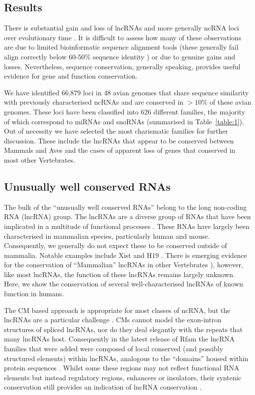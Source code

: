 \documentclass[10pt]{bmc_article}
\newenvironment{bmcformat}{\begin{raggedright}\baselineskip20pt\sloppy\setboolean{publ}{false}}{\end{raggedright}\baselineskip20pt\sloppy}
\begin{document}
\begin{bmcformat}
\section*{Results}

There is substantial gain and loss of lncRNAs
\cite{Cabili:2011,Kutter:2012} and more generally ncRNA loci over
evolutionary time \cite{Hoeppner:2012}. It is difficult to assess how
many of these observations are due to limited bioinformatic sequence
alignment tools (these generally fail align correctly below 60-50\%
sequence identity \cite{Gardner:2005:Nucleic-Acids-Res:15860779}) or
due to genuine gains and losses. Nevertheless, sequence conservation,
generally speaking, provides useful evidence for gene and function
conservation.

We have identified 66,879 loci in 48 avian genomes that share sequence
similarity with previously characterised ncRNAs and are conserved in
$>10\%$ of these avian genomes. These loci have been classified into
626 different families, the majority of which correspond to miRNAs and
snoRNAs (summarised in Table~\ref{table:1}). Out of necessity we have
selected the most charismatic families for further discussion. These
include the lncRNAs that appear to be conserved between Mammals and
Aves and the cases of apparent loss of genes that conserved in most
other Vertebrates.


\subsection*{Unusually well conserved RNAs}

The bulk of the ``unusually well conserved RNAs'' belong to the long
non-coding RNA (lncRNA) group.  The lncRNAs are a diverse group of
RNAs that have been implicated in a multitude of functional processes
\cite{Rinn:2007,Chow:2005,Guttman:2009,Ulitsky:2013}. These RNAs have largely been
characterised in mammalian species, particularly human and
mouse. Consequently, we generally do not expect these to be conserved
outside of mammalia. Notable examples include Xist \cite{Duret:2006}
and H19 \cite{Smits:2008}.  There is emerging evidence for the
conservation of ``Mammalian'' lncRNAs in other Vertebrates
\cite{Chodroff:2010,Ulitsky:2011}), however, like most lncRNAs, the
function of these lncRNAs remains largely unknown. Here, we show the
conservation of several well-characterised lncRNAs of known function
in humans. 


The CM based approach is appropriate for most classes of ncRNA, but
the lncRNAs are a particular challenge \cite{Guttman:2009}.  CMs
cannot model the exon-intron structures of spliced lncRNAs, nor do
they deal elegantly with the repeats that many lncRNAs
host. Consequently in the latest release of Rfam the lncRNA families
that were added were composed of local conserved (and possibly
structured elements) within lncRNAs, analogous to the ``domains''
housed within protein sequences \cite{Burge:2013}. Whilst some these
regions may not reflect functional RNA elements but instead regulatory
regions, enhancers or insulators, their syntenic conservation still
provides an indication of lncRNA conservation
\cite{diederichs2014four}.



\end{bmcformat}
\end{document}
